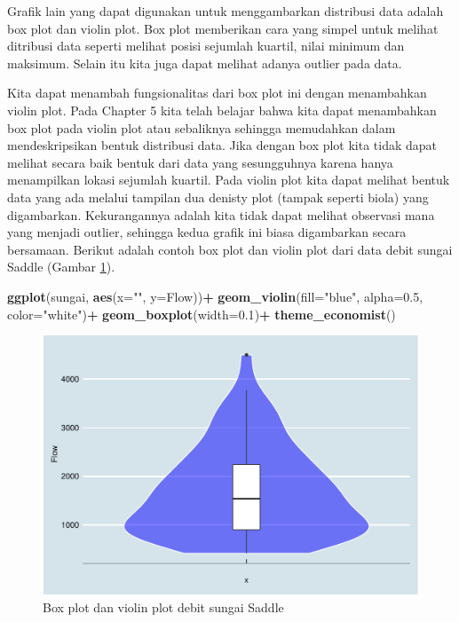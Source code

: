 \documentclass[]{book}
\newenvironment{Shaded}{\begin{snugshade}}{\end{snugshade}}
\newcommand{\KeywordTok}[1]{\textcolor[rgb]{0.13,0.29,0.53}{\textbf{#1}}}
\newcommand{\DataTypeTok}[1]{\textcolor[rgb]{0.13,0.29,0.53}{#1}}
\newcommand{\FloatTok}[1]{\textcolor[rgb]{0.00,0.00,0.81}{#1}}
\newcommand{\StringTok}[1]{\textcolor[rgb]{0.31,0.60,0.02}{#1}}
\newcommand{\OperatorTok}[1]{\textcolor[rgb]{0.81,0.36,0.00}{\textbf{#1}}}
\newcommand{\NormalTok}[1]{#1}
\begin{document}
Grafik lain yang dapat digunakan untuk menggambarkan distribusi data
adalah box plot dan violin plot. Box plot memberikan cara yang simpel
untuk melihat ditribusi data seperti melihat posisi sejumlah kuartil,
nilai minimum dan maksimum. Selain itu kita juga dapat melihat adanya
outlier pada data.

Kita dapat menambah fungsionalitas dari box plot ini dengan menambahkan
violin plot. Pada Chapter 5 kita telah belajar bahwa kita dapat
menambahkan box plot pada violin plot atau sebaliknya sehingga
memudahkan dalam mendeskripsikan bentuk distribusi data. Jika dengan box
plot kita tidak dapat melihat secara baik bentuk dari data yang
sesungguhnya karena hanya menampilkan lokasi sejumlah kuartil. Pada
violin plot kita dapat melihat bentuk data yang ada melalui tampilan dua
denisty plot (tampak seperti biola) yang digambarkan. Kekurangannya
adalah kita tidak dapat melihat observasi mana yang menjadi outlier,
sehingga kedua grafik ini biasa digambarkan secara bersamaan. Berikut
adalah contoh box plot dan violin plot dari data debit sungai Saddle
(Gambar \ref{fig:bpeda}).

\begin{Shaded}
\begin{Highlighting}[]
\KeywordTok{ggplot}\NormalTok{(sungai, }\KeywordTok{aes}\NormalTok{(}\DataTypeTok{x=}\StringTok{""}\NormalTok{, }\DataTypeTok{y=}\NormalTok{Flow))}\OperatorTok{+}
\StringTok{  }\KeywordTok{geom_violin}\NormalTok{(}\DataTypeTok{fill=}\StringTok{"blue"}\NormalTok{, }\DataTypeTok{alpha=}\FloatTok{0.5}\NormalTok{, }\DataTypeTok{color=}\StringTok{"white"}\NormalTok{)}\OperatorTok{+}
\StringTok{  }\KeywordTok{geom_boxplot}\NormalTok{(}\DataTypeTok{width=}\FloatTok{0.1}\NormalTok{)}\OperatorTok{+}
\StringTok{  }\KeywordTok{theme_economist}\NormalTok{()}
\end{Highlighting}
\end{Shaded}

\begin{figure}

{\centering \includegraphics[width=0.7\linewidth]{EnvStat_files/figure-latex/bpeda-1} 

}

\caption{Box plot dan violin plot debit sungai Saddle}\label{fig:bpeda}
\end{figure}
\end{document}
